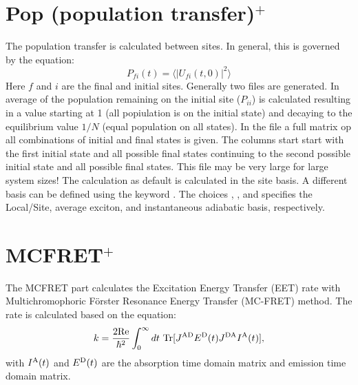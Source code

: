 \section{Pop (population transfer)$^{+}$}
The population transfer is calculated between sites.
In general, this is governed by the equation:
\begin{equation}
P_{fi}(t)=\langle |U_{fi}(t,0)|^2 \rangle
\end{equation}
Here $f$ and $i$ are the final and initial sites.
Generally two files are generated.
In  average of the population remaining on the initial site ($P_{ii}$) is calculated resulting in a value starting at 1 (all popiulation is on the initial state) and decaying to the equilibrium value $1/N$ (equal population on all states).
In the  file a full matrix op all combinations of initial and final states is given.
The columns start start with the first initial state and all possible final states continuing to the second possible initial state and all possible final states.
This file may be very large for large system sizes!
The calculation as default is calculated in the site basis.
A different basis can be defined using the keyword .
The choices , , and  specifies the Local/Site, average exciton, and instantaneous adiabatic basis, respectively.

\section{MCFRET$^{+}$}
The MCFRET part calculates the Excitation Energy Transfer (EET) rate with Multichromophoric Förster Resonance Energy Transfer (MC-FRET) method.\cite{Jang.2004.Phys.Rev.Lett..92.218301,Jang.2007.J.Phys.Chem.B..111.6807,Zhong.2023.J.Chem.Phys..158.064103} The rate is calculated based on the equation:
\begin{equation}\label{eq:17} 
    k=\frac{\rm 2Re}{\hbar^2}\int_{0}^{\infty}dt\ \textrm{Tr}[J^{\textrm {AD}}E^{\textrm D}(t)J^{\textrm {DA}}I^{\textrm A}(t)],
\end{equation}
with $I^{\textrm A}(t)$ and $E^{\textrm D}(t)$ are the absorption time domain matrix and emission time domain matrix. 


